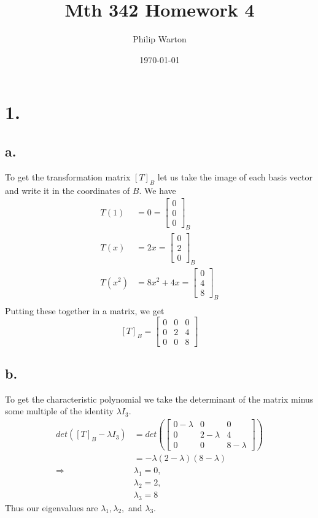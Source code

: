 \documentclass{article}
\begin{document}
\title{Mth 342 Homework 4}
\author{Philip Warton}
\date{\today}
\maketitle

\section*{1.}
	\subsection*{a.}
		To get the transformation matrix $[T]_B$ let us take the image of each basis vector and write it in the coordinates of $B$. We have 
		\begin{align*}
			T(1) & = 0 = \begin{bmatrix}0\\0\\0\end{bmatrix}_B \\
			T(x) & = 2x = \begin{bmatrix}0\\2\\0\end{bmatrix}_B \\
			T(x^2) & = 8x^2+4x = \begin{bmatrix}0\\4\\8\end{bmatrix}_B \\
		\end{align*}
		Putting these together in a matrix, we get
		\[ [T]_B =  \begin{bmatrix}0&0&0\\0&2&4\\0&0&8\end{bmatrix} \]

	\subsection*{b.}
		To get the characteristic polynomial we take the determinant of the matrix minus some multiple of the identity $\lambda I_3$.
		\begin{align*}
		det([T]_B - \lambda I_3) & = det( \begin{bmatrix}0-\lambda&0&0\\0&2-\lambda&4\\0&0&8-\lambda\end{bmatrix} ) \\
		& = -\lambda(2-\lambda)(8-\lambda) \\ 
		 \Longrightarrow & \lambda_1 = 0, \\
 		& \lambda_2 = 2, \\
		& \lambda_3 = 8
		\end{align*}
		Thus our eigenvalues are $\lambda_1, \lambda_2,$ and $\lambda_3$.
	
\end{document}
